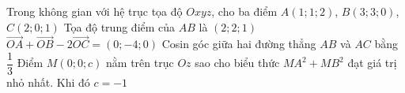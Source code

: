 \begin{ex}%
	Trong không gian với hệ trục tọa độ $Oxyz$, cho ba điểm $A(1; 1; 2)$, $B(3; 3; 0)$, $C(2; 0; 1)$
	\choiceTF
	{\True Tọa độ trung điểm của $AB$ là $(2; 2; 1)$}
	{$\overrightarrow{OA} + \overrightarrow{OB} - 2\overrightarrow{OC} = (0; -4; 0)$}
	{\True Cosin góc giữa hai đường thẳng $AB$ và $AC$ bằng $\dfrac{1}{3}$}
	{Điểm $M(0; 0; c)$ nằm trên trục $Oz$ sao cho biểu thức $MA^2 + MB^2$ đạt giá trị nhỏ nhất. Khi đó $c = -1$}
\end{ex}

